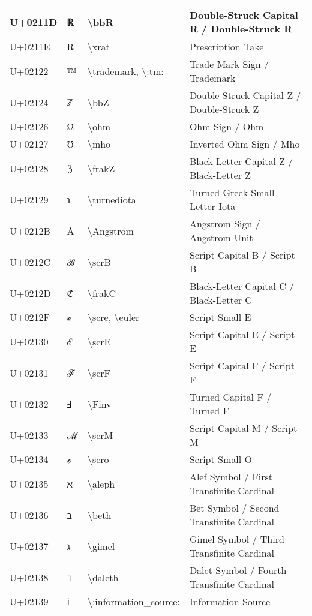 \begin{table}[h]
\begin{tabulary}{\linewidth}{|L|L|L|L|}
\hline
U+0211D & ℝ & {\textbackslash}bbR & Double-Struck Capital R / Double-Struck R \\
\hline
U+0211E & ℞ & {\textbackslash}xrat & Prescription Take \\
\hline
U+02122 & ™ & {\textbackslash}trademark, {\textbackslash}:tm: & Trade Mark Sign / Trademark \\
\hline
U+02124 & ℤ & {\textbackslash}bbZ & Double-Struck Capital Z / Double-Struck Z \\
\hline
U+02126 & Ω & {\textbackslash}ohm & Ohm Sign / Ohm \\
\hline
U+02127 & ℧ & {\textbackslash}mho & Inverted Ohm Sign / Mho \\
\hline
U+02128 & ℨ & {\textbackslash}frakZ & Black-Letter Capital Z / Black-Letter Z \\
\hline
U+02129 & ℩ & {\textbackslash}turnediota & Turned Greek Small Letter Iota \\
\hline
U+0212B & Å & {\textbackslash}Angstrom & Angstrom Sign / Angstrom Unit \\
\hline
U+0212C & ℬ & {\textbackslash}scrB & Script Capital B / Script B \\
\hline
U+0212D & ℭ & {\textbackslash}frakC & Black-Letter Capital C / Black-Letter C \\
\hline
U+0212F & ℯ & {\textbackslash}scre, {\textbackslash}euler & Script Small E \\
\hline
U+02130 & ℰ & {\textbackslash}scrE & Script Capital E / Script E \\
\hline
U+02131 & ℱ & {\textbackslash}scrF & Script Capital F / Script F \\
\hline
U+02132 & Ⅎ & {\textbackslash}Finv & Turned Capital F / Turned F \\
\hline
U+02133 & ℳ & {\textbackslash}scrM & Script Capital M / Script M \\
\hline
U+02134 & ℴ & {\textbackslash}scro & Script Small O \\
\hline
U+02135 & ℵ & {\textbackslash}aleph & Alef Symbol / First Transfinite Cardinal \\
\hline
U+02136 & ℶ & {\textbackslash}beth & Bet Symbol / Second Transfinite Cardinal \\
\hline
U+02137 & ℷ & {\textbackslash}gimel & Gimel Symbol / Third Transfinite Cardinal \\
\hline
U+02138 & ℸ & {\textbackslash}daleth & Dalet Symbol / Fourth Transfinite Cardinal \\
\hline
U+02139 & ℹ & {\textbackslash}:information\_source: & Information Source \\

\end{tabulary}
\end{table}
